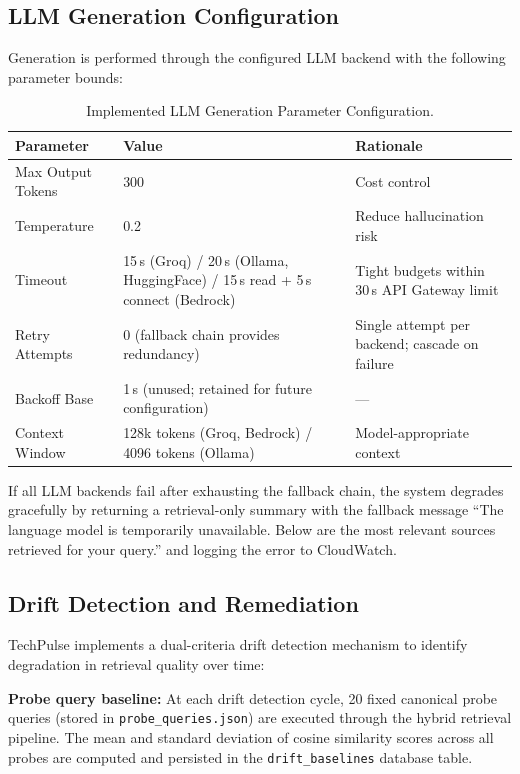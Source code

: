 \subsection{LLM Generation Configuration}

Generation is performed through the configured LLM backend with the following parameter bounds:

\begin{table}[H]
\caption{Implemented LLM Generation Parameter Configuration.}
\label{tab:llm_params}
\centering
\begin{tabular}{p{3.0cm}p{5.5cm}p{4.0cm}}
\toprule
\textbf{Parameter} & \textbf{Value} & \textbf{Rationale} \\
\midrule
Max Output Tokens & 300 & Cost control \\
Temperature & 0.2 & Reduce hallucination risk \\
Timeout & 15\,s (Groq) / 20\,s (Ollama, HuggingFace) / 15\,s read + 5\,s connect (Bedrock) & Tight budgets within 30\,s API Gateway limit \\
Retry Attempts & 0 (fallback chain provides redundancy) & Single attempt per backend; cascade on failure \\
Backoff Base & 1\,s (unused; retained for future configuration) & ---  \\
Context Window & 128k tokens (Groq, Bedrock) / 4096 tokens (Ollama) & Model-appropriate context \\
\bottomrule
\end{tabular}
\end{table}

If all LLM backends fail after exhausting the fallback chain, the system degrades gracefully by returning a retrieval-only summary with the fallback message ``The language model is temporarily unavailable. Below are the most relevant sources retrieved for your query.'' and logging the error to CloudWatch.

\subsection{Drift Detection and Remediation}
\label{sec:drift}

TechPulse implements a dual-criteria drift detection mechanism to identify degradation in retrieval quality over time:

\textbf{Probe query baseline:} At each drift detection cycle, 20 fixed canonical probe queries (stored in \texttt{probe\_queries.json}) are executed through the hybrid retrieval pipeline. The mean and standard deviation of cosine similarity scores across all probes are computed and persisted in the \texttt{drift\_baselines} database table.

